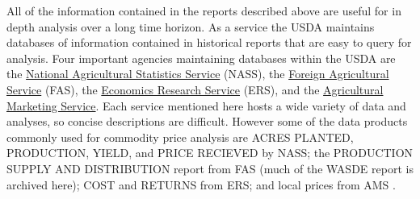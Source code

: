 \documentclass[
]{book}
\begin{document}
All of the information contained in the reports described above are useful for in depth analysis over a long time horizon. As a service the USDA maintains databases of information contained in historical reports that are easy to query for analysis. Four important agencies maintaining databases within the USDA are the \href{http://www.nass.usda.gov/}{National Agricultural Statistics Service} (NASS), the \href{http://apps.fas.usda.gov/psdonline/psdHome.aspx}{Foreign Agricultural Service} (FAS), the \href{http://www.ers.usda.gov/data-products.aspx}{Economics Research Service} (ERS), and the \href{http://www.ams.usda.gov/market-news/livestock-poultry-grain\#Grain}{Agricultural Marketing Service}. Each service mentioned here hosts a wide variety of data and analyses, so concise descriptions are difficult. However some of the data products commonly used for commodity price analysis are ACRES PLANTED, PRODUCTION, YIELD, and PRICE RECIEVED by NASS; the PRODUCTION SUPPLY AND DISTRIBUTION report from FAS (much of the WASDE report is archived here); COST and RETURNS from ERS; and local prices from AMS .
\end{document}

